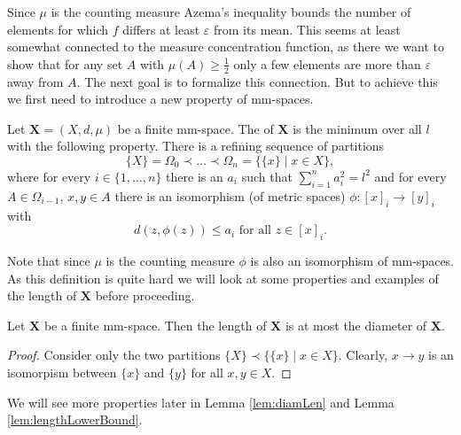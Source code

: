 Since $\mu$ is the counting measure Azema's inequality bounds the number of elements for which $f$ differs at least $\varepsilon$ from its mean. This seems at least somewhat connected to the measure concentration function, as there we want to show that for any set $A$ with $\mu(A)\geq\frac{1}{2}$ only a few elements are more than $\varepsilon$ away from $A$.
The next goal is to formalize this connection. %
But to achieve this we first need to introduce a new property of mm-spaces.
\begin{definition}\label{def:length}
Let $\boldsymbol{X}=(X,d,\mu)$ be a finite mm-space. The  of $\boldsymbol X$ is the minimum over all $l$ with the following property. There is a refining sequence of partitions 
\[\{X\}=\Omega_0\prec\dots\prec\Omega_n=\{\{x\}\mid x\in X\},\]
where for every $i\in\{1,\dots,n\}$ there is an $a_i$ such that $\sum_{i=1}^{n}a^2_i=l^2$ and for every $A\in \Omega_{i-1}$, $x,y\in A$ there is an isomorphism (of metric spaces) $\phi\colon[x]_i\to [y]_i$ with 
\[d(z,\phi(z))\leq a_i\text{ for all $z\in[x]_i$.}\]
\end{definition}

Note that since $\mu$ is the counting measure $\phi$ is also an isomorphism of mm-spaces.
As this definition is quite hard we will look at some properties and examples of the length of $\boldsymbol{X}$ before proceeding.
\begin{lemma}
Let $\boldsymbol{X}$ be a finite mm-space. Then the length of $\boldsymbol{X}$ is at most the diameter of $\boldsymbol{X}$.
\end{lemma}
\begin{proof}
Consider only the two partitions $\{X\}\prec\{\{x\}\mid x\in X\}$. Clearly,  $x\to y$ is an isomorpism between $\{x\}$ and $\{y\}$ for all $x,y\in X$.
\end{proof}

We will see more properties later in Lemma \ref{lem:diamLen} and Lemma \ref{lem:lengthLowerBound}.

